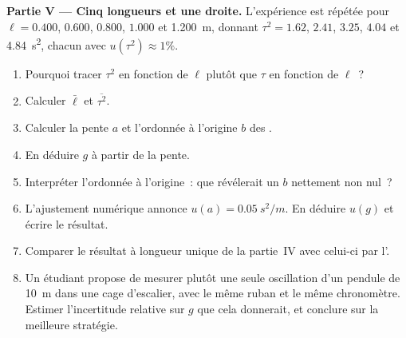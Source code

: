 \begin{problem}
\medskip
\noindent\textbf{Partie V --- Cinq longueurs et une droite.}
L'expérience est répétée pour $\ell = 0.400$, $0.600$, $0.800$, $1.000$
et \qty{1.200}{m}, donnant $\tau^2 = 1.62$, $2.41$, $3.25$, $4.04$ et
\qty{4.84}{s^2}, chacun avec $u(\tau^2) \approx 1\%$.
\begin{enumerate}[resume]
  \item Pourquoi tracer $\tau^2$ en fonction de $\ell$ plutôt que $\tau$
        en fonction de $\ell$~?
  \item Calculer $\bar\ell$ et $\overline{\tau^2}$.
  \item Calculer la pente $a$ et l'ordonnée à l'origine $b$ des .
  \item En déduire $g$ à partir de la pente.
  \item Interpréter l'ordonnée à l'origine~: que révélerait un $b$
        nettement non nul~?
  \item L'ajustement numérique annonce $u(a) = \qty{0.05}{s^2/m}$. En
        déduire $u(g)$ et écrire le résultat.
  \item Comparer le résultat à longueur unique de la partie~IV avec
        celui-ci par l'.
  \item Un étudiant propose de mesurer plutôt une seule oscillation d'un
        pendule de \qty{10}{m} dans une cage d'escalier, avec le même
        ruban et le même chronomètre. Estimer l'incertitude relative sur
        $g$ que cela donnerait, et conclure sur la meilleure stratégie.
\end{enumerate}
\end{problem}
